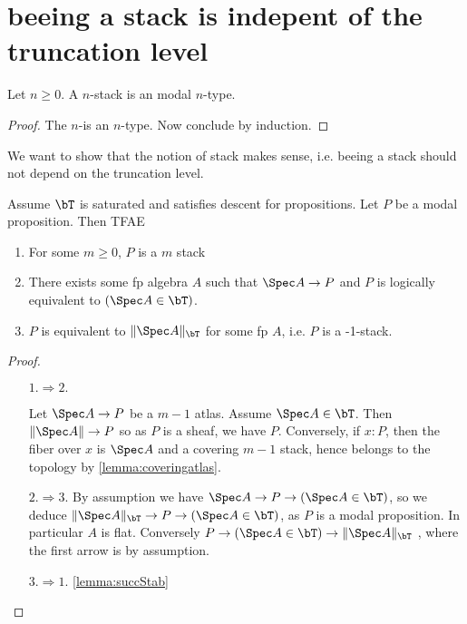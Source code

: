 \section{ beeing a stack is indepent of the truncation level}


\begin{lemma}
	Let $n \ge 0$. A  $n$-stack is an modal $n$-type.
\end{lemma}
\begin{proof}
	The $n$-\truncation is an $n$-type. Now conclude by induction.
\end{proof}
We want to show that the notion of  stack makes sense, i.e. beeing a stack should not depend on the truncation level. 

\begin{lemma}{\label{lemma:prop0stacks}}
	Assume $\bT$ is saturated and satisfies descent for propositions. Let $P$ be a modal proposition. Then TFAE 
	\begin{enumerate}
		\item For some $m \ge 0$, $P$ is a  $m$ stack 
		
		\item There exists some fp algebra $A$ such that $\Spec A \to P$ and $P$ is logically equivalent to $(\Spec A \in \bT)$.
		\item $P$ is equivalent to $\| \Spec A \|_\bT$ for some fp $A$, i.e. $P$ is a  -1-stack.
	\end{enumerate}
	
	
\end{lemma}
\begin{proof}
	\
	\begin{itemize}
		\item[$1.\Rightarrow 2.$]
		
		Let $\Spec A \to P$ be a $m-1$ atlas. Assume $\Spec A \in \bT$. Then $\|\Spec A\| \to P$ so as $P$ is a sheaf, we have $P$. Conversely, if $x : P$, then the fiber over $x$ is $\Spec A$ and a covering $m-1$ stack, hence belongs to the topology by \ref{lemma:coveringatlas}. 
		\item[$2. \Rightarrow 3.$]
		By assumption we have $\Spec A \to P \to (\Spec A \in \bT)$, so we deduce 
		$\| \Spec A\|_\bT \to P \to (\Spec A \in \bT)$, as $P$ is a modal proposition. In particular $A$ is flat. Conversely $P \to (\Spec A \in \bT) \to \|\Spec A\|_\bT$ , where the first arrow is by assumption.
		\item [$3. \Rightarrow 1.$] \ref{lemma:succStab}
	\end{itemize}
\end{proof}
